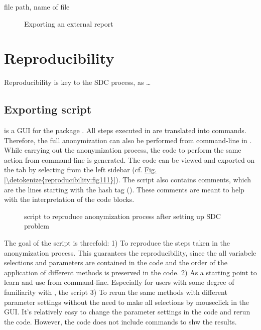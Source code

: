 \documentclass[letterpaper,10pt,english]{sphinxmanual}
\begin{document}
file path, name of file

\begin{figure}[htbp]
\centering
\capstart

\noindent{}
\caption{Exporting an external report}\label{\detokenize{export:fig104}}\label{\detokenize{export:id3}}\end{figure}


\chapter{Reproducibility}
\label{\detokenize{reproducibility::doc}}\label{\detokenize{reproducibility:reproducibility}}
Reproducibility is key to the SDC process, as …


\section{Exporting  script}
\label{\detokenize{reproducibility:exporting-r-script}}
 is a GUI for the  package . All steps executed in  are translated
into  commands. Therefore, the full anonymization can also be performed from command-line
in . While carrying out the anonymization process, the code to perform the same action
from command-line is generated. The code can be viewed and exported on the 
tab by selecting  from the left sidebar (cf. \hyperref[\detokenize{reproducibility:fig111}]{Fig.\@ \ref{\detokenize{reproducibility:fig111}}}).
The script also contains comments, which are the lines starting with the hash tag (\sphinxcode{\sphinxupquote{\#}}).
These comments are meant to help with the interpretation of the code blocks.

\begin{figure}[htbp]
\centering
\capstart

\noindent{}
\caption{ script to reproduce anonymization process after setting up SDC problem}\label{\detokenize{reproducibility:fig111}}\label{\detokenize{reproducibility:id5}}\end{figure}

The goal of the  script is threefold:
1) To reproduce the steps taken in the anonymization process. This guarantees
the reproducibility, since the all variabele selections and parameters are contained in the
code and the order of the application of different methods is preserved in the code.
2) As a starting point to learn  and use  from  command-line. Especially for
users with some degree of familiarity with , the script
3) To rerun the same methods with different parameter settings without the need to make
all selections by mouseclick in the GUI. It’s relatively easy to change the parameter settings
in the  code and rerun the code. However, the code does not include commands to shw
the results.
\end{document}
